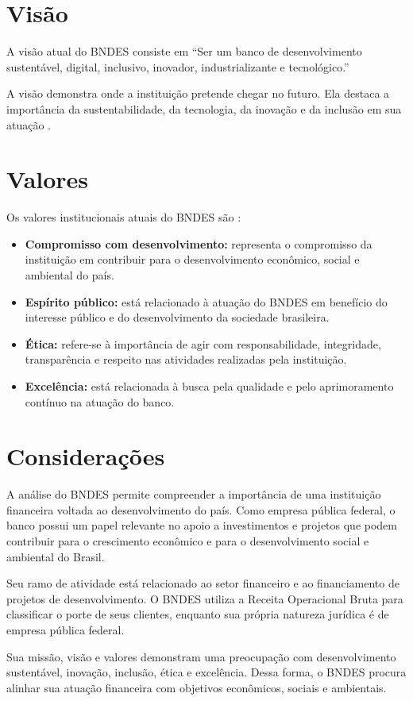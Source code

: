 
\section{Visão}

A visão atual do BNDES consiste em \enquote{Ser um banco de desenvolvimento sustentável, digital, inclusivo, inovador, industrializante e tecnológico.} \cite{bndes2026planejamento}

A visão demonstra onde a instituição pretende chegar no futuro. Ela destaca a importância da sustentabilidade, da tecnologia, da inovação e da inclusão em sua atuação \cite{bndes2026planejamento}.


\section{Valores}

Os valores institucionais atuais do BNDES são \cite{bndes2026planejamento}:

\begin{itemize}
    \item \textbf{Compromisso com desenvolvimento:} representa o compromisso da instituição em contribuir para o desenvolvimento econômico, social e ambiental do país.
    \item \textbf{Espírito público:} está relacionado à atuação do BNDES em benefício do interesse público e do desenvolvimento da sociedade brasileira.
    \item \textbf{Ética:} refere-se à importância de agir com responsabilidade, integridade, transparência e respeito nas atividades realizadas pela instituição.
    \item \textbf{Excelência:} está relacionada à busca pela qualidade e pelo aprimoramento contínuo na atuação do banco.
\end{itemize}


\section{Considerações}

A análise do BNDES permite compreender a importância de uma instituição financeira voltada ao desenvolvimento do país. Como empresa pública federal, o banco possui um papel relevante no apoio a investimentos e projetos que podem contribuir para o crescimento econômico e para o desenvolvimento social e ambiental do Brasil.

Seu ramo de atividade está relacionado ao setor financeiro e ao financiamento de projetos de desenvolvimento. O BNDES utiliza a Receita Operacional Bruta para classificar o porte de seus clientes, enquanto sua própria natureza jurídica é de empresa pública federal.

Sua missão, visão e valores demonstram uma preocupação com desenvolvimento sustentável, inovação, inclusão, ética e excelência. Dessa forma, o BNDES procura alinhar sua atuação financeira com objetivos econômicos, sociais e ambientais.